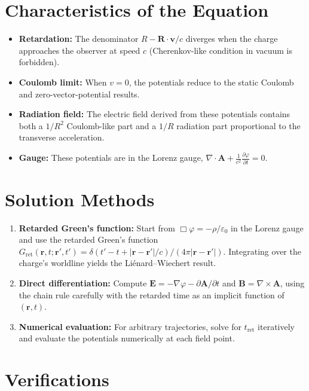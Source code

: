 \section*{Characteristics of the Equation}

\begin{itemize}
  \item \textbf{Retardation:} The denominator $R - \mathbf{R}\cdot\mathbf{v}/c$ diverges when the charge approaches the observer at speed $c$ (Cherenkov-like condition in vacuum is forbidden).
  \item \textbf{Coulomb limit:} When $v = 0$, the potentials reduce to the static Coulomb and zero-vector-potential results.
  \item \textbf{Radiation field:} The electric field derived from these potentials contains both a $1/R^{2}$ Coulomb-like part and a $1/R$ radiation part proportional to the transverse acceleration.
  \item \textbf{Gauge:} These potentials are in the Lorenz gauge, $\nabla\cdot\mathbf{A} + \frac{1}{c^{2}}\frac{\partial\varphi}{\partial t} = 0$.
\end{itemize}
\section*{Solution Methods}

\begin{enumerate}
  \item \textbf{Retarded Green's function:} Start from $\Box\varphi = -\rho/\varepsilon_{0}$ in the Lorenz gauge and use the retarded Green's function $G_{\text{ret}}(\mathbf{r},t;\mathbf{r}',t') = \delta(t' - t + |\mathbf{r}-\mathbf{r}'|/c)/(4\pi|\mathbf{r}-\mathbf{r}'|)$. Integrating over the charge's worldline yields the Liénard--Wiechert result.
  \item \textbf{Direct differentiation:} Compute $\mathbf{E} = -\nabla\varphi - \partial\mathbf{A}/\partial t$ and $\mathbf{B} = \nabla\times\mathbf{A}$, using the chain rule carefully with the retarded time as an implicit function of $(\mathbf{r}, t)$.
  \item \textbf{Numerical evaluation:} For arbitrary trajectories, solve for $t_{\text{ret}}$ iteratively and evaluate the potentials numerically at each field point.
\end{enumerate}
\section*{Verifications}

